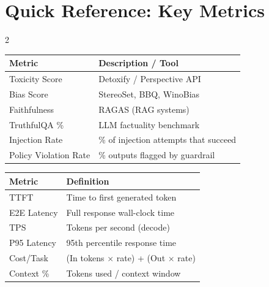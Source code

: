 \documentclass[12pt, letterpaper]{article}
\begin{document}
\begin{center}
\end{center}

\newpage

\section{Quick Reference: Key Metrics}

\begin{multicols}{2}

\begin{tcolorbox}[safetybox, title={Safety Metrics Quick Reference}]
    \begin{tabular}{@{}p{2.5cm}p{4cm}@{}}
        \textbf{Metric} & \textbf{Description / Tool} \\
        \midrule
        Toxicity Score & Detoxify / Perspective API \\
        Bias Score & StereoSet, BBQ, WinoBias \\
        Faithfulness & RAGAS (RAG systems) \\
        TruthfulQA \% & LLM factuality benchmark \\
        Injection Rate & \% of injection attempts that succeed \\
        Policy Violation Rate & \% outputs flagged by guardrail \\
    \end{tabular}
\end{tcolorbox}

\vspace{0.3cm}

\begin{tcolorbox}[perfbox, title={Infrastructure Performance}]
    \begin{tabular}{@{}p{2.2cm}p{4cm}@{}}
        \textbf{Metric} & \textbf{Definition} \\
        \midrule
        TTFT & Time to first generated token \\
        E2E Latency & Full response wall-clock time \\
        TPS & Tokens per second (decode) \\
        P95 Latency & 95th percentile response time \\
        Cost/Task & (In tokens $\times$ rate) + (Out $\times$ rate) \\
        Context \% & Tokens used / context window \\
    \end{tabular}
\end{tcolorbox}


\end{multicols}
\end{document}
